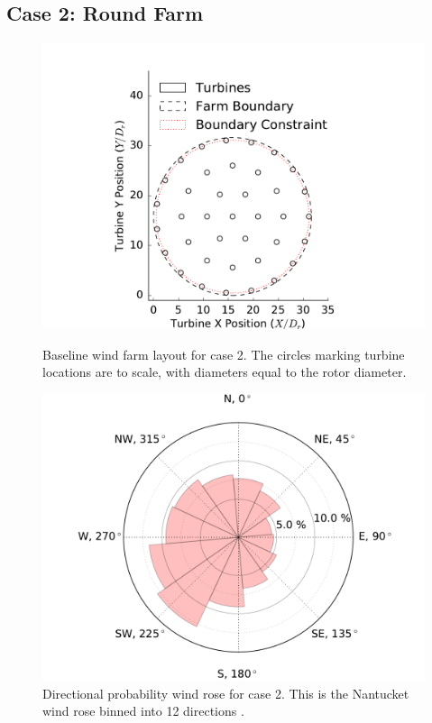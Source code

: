 \documentclass[a4paper]{jpconf}
\begin{document}
\subsection{Case 2: Round Farm}
\begin{figure}[h!]
\centering
\begin{minipage}[t]{18pc}
\centering
\includegraphics[width=\textwidth, trim={3cm, 0cm, 3cm, 0cm}, clip]{final_images/round_farm_38Turbines_5DSpacing_start.pdf}
\caption{Baseline wind farm layout for case 2. The circles marking turbine locations are to scale, with diameters equal to the rotor diameter.}
\label{fig:round_case}
\end{minipage}\hspace{1pc}%
\begin{minipage}[t]{18pc}
\centering
\includegraphics[width=\textwidth, trim={1.5cm 0cm 1.5cm 0cm}, clip]{final_images/nantucket_windrose.pdf}
\caption{Directional probability wind rose for case 2. This is the Nantucket wind rose binned into 12 directions \cite{wrcc2017}.}
\label{fig:nantucket}
\end{minipage} 
\end{figure}
\end{document}
